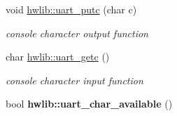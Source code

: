 \begin{DoxyCompactItemize}
void \hyperlink{hwlib-due_8hpp_a67bf0f42feb7032baece1dbb91048324}{hwlib\+::uart\+\_\+putc} (char c)
\begin{DoxyCompactList}\small\item\em console character output function \end{DoxyCompactList}\item 
char \hyperlink{hwlib-due_8hpp_a0f433c14b5302d476ed723a38862d9d3}{hwlib\+::uart\+\_\+getc} ()
\begin{DoxyCompactList}\small\item\em console character input function \end{DoxyCompactList}\item 
bool {\bfseries hwlib\+::uart\+\_\+char\+\_\+available} ()\hypertarget{hwlib-ostream_01-_01_copy_8hpp_a043e544129f4478caa81dc3c57d8943e}{}\label{hwlib-ostream_01-_01_copy_8hpp_a043e544129f4478caa81dc3c57d8943e}

\end{DoxyCompactItemize}
